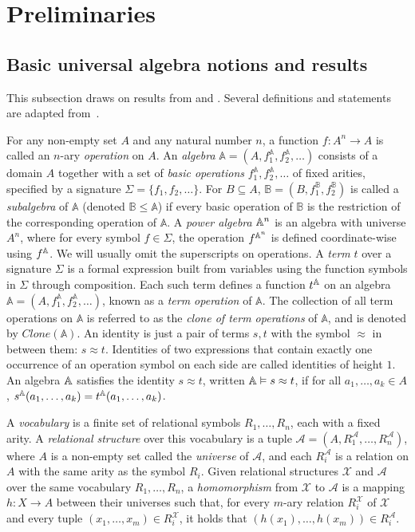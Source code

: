\documentclass{article}
\newcommand{\A}{\ensuremath\mathbb{A}}
\theoremstyle{definition}
\theoremstyle{theorem}
\theoremstyle{theorem}
\theoremstyle{remark}
\theoremstyle{remark}
\theoremstyle{example}
\theoremstyle{notation}
\theoremstyle{theorem}
\begin{document}
\section{Preliminaries}

\subsection{Basic universal algebra notions and results}\label{prelimal}


This subsection draws on results from \cite{10.1145/2677161.2677165} and \cite{barto_et_al}. Several definitions and statements are adapted from~\cite{BurrisSankappanavar1981}. 

    For any non-empty set $A$ and any natural number $n$, a function $f \colon A^n \to A$ is called an $n$-ary \emph{operation} on $A$. An \emph{algebra} $\mathbb{A} = (A, f^\mathbb{A}_1, f^\mathbb{A}_2, \ldots)$ consists of a domain $A$ together with a set of \emph{basic operations} $f^\mathbb{A}_1, f^\mathbb{A}_2, \ldots$ of fixed arities, specified by a signature $\Sigma = \{f_1, f_2, \ldots\}$. For $B\subseteq A$, $\mathbb{B}=(B,f^\mathbb{B}_1, f^\mathbb{B}_2)$ is called a \emph{subalgebra} of $\mathbb{A}$ (denoted $\mathbb{B}\leq\mathbb{A}$) if every basic operation of $\mathbb{B}$ is the restriction of the corresponding operation of $\mathbb{A}$. A \emph{power algebra} $\A^n$ is an algebra with universe $A^n$, where for every symbol $f \in \Sigma$, the operation $f^{\A^n}$ is defined coordinate-wise using $f^{\A}$. We will usually omit the superscripts on operations. A \emph{term} $t$ over a signature $\Sigma$ is a formal expression built from variables using the function symbols in $\Sigma$ through composition. Each such term defines a function $t^{\A}$ on an algebra $\mathbb{A} = (A, f^\mathbb{A}_1, f^\mathbb{A}_2, \ldots)$, known as a \emph{term operation} of $\mathbb{A}$. The collection of all term operations on $\mathbb{A}$ is referred to as the \emph{clone of term operations} of $\mathbb{A}$, and is denoted by $Clone(\mathbb{A})$. An identity is just a pair of terms $s, t$ with the symbol $\approx$ in between them: $s\approx t$. Identities of two expressions that contain exactly one occurrence of an operation symbol on each side are called identities of height $1$. An algebra $\A$ satisfies the identity $s\approx t$, written $\A\vDash s\approx t$, if for all $a_1,\ldots,a_k\in A$, $s^{\A}(a_1,\ldots,a_k) = t^{\A}(a_1,\ldots,a_k)$. 
    
    
    A \emph{vocabulary} is a finite set of relational symbols $R_1, \ldots, R_n$, each with a fixed arity. A \emph{relational structure} over this vocabulary is a tuple $\mathcal{A} = (A, R_1^\mathcal{A}, \ldots, R_n^\mathcal{A})$, where $A$ is a non-empty set called the \emph{universe} of $\mathcal{A}$, and each $R_i^\mathcal{A}$ is a relation on $A$ with the same arity as the symbol $R_i$. Given relational structures $\mathcal{X}$ and $\mathcal{A}$ over the same vocabulary $R_1, \ldots, R_n$, a \emph{homomorphism} from $\mathcal{X}$ to $\mathcal{A}$ is a mapping $h \colon X \to A$ between their universes such that, for every $m$-ary relation $R_i^\mathcal{X}$ of $\mathcal{X}$ and every tuple $(x_1, \ldots, x_m) \in R_i^\mathcal{X}$, it holds that $(h(x_1), \ldots, h(x_m)) \in R_i^\mathcal{A}$.
\end{document}
